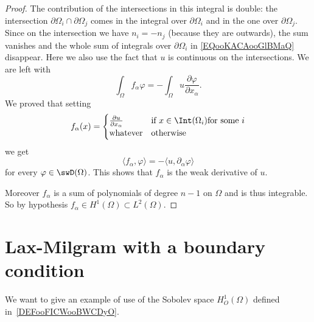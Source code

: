 \begin{proof}
	The contribution of the intersections in this integral is double: the intersection \( \partial\Omega_i\cap\partial\Omega_j\) comes in the integral over \( \partial\Omega_i\) and in the one over \( \partial\Omega_j\). Since on the intersection we have \( n_i=-n_j\) (because they are outwards), the sum vanishes and the whole sum of integrals over \( \partial\Omega_i\) in \eqref{EQooKACAooGlBMaQ} disappear. Here we also use the fact that \( u\) is continuous on the intersections. We are left with
	\begin{equation}
		\int_{\Omega}f_{\alpha}\varphi=-\int_{\Omega}u\frac{ \partial \varphi }{ \partial x_{\alpha} }.
	\end{equation}
	We proved that setting
	\begin{equation}
		f_{\alpha}(x)=\begin{cases}
			\frac{ \partial u }{ \partial x_{\alpha} } & \text{if } x\in\Int(\Omega_i) \text{for some }i \\
			\text{whatever}                            & \text{otherwise }
		\end{cases}
	\end{equation}
	we get
	\begin{equation}
		\langle f_{\alpha}, \varphi\rangle =-\langle u, \partial_{\alpha}\varphi\rangle
	\end{equation}
	for every \( \varphi\in\swD(\Omega)\). This shows that \( f_{\alpha}\) is the weak derivative of \( u\).

	Moreover \( f_{\alpha}\) is a sum of polynomials of degree \( n-1\) on \( \Omega\) and is thus integrable. So by hypothesis \( f_{\alpha}\in H^1(\Omega)\subset L^2(\Omega)\).
\end{proof}

\section{Lax-Milgram with a boundary condition}

We want to give an example of use of the Sobolev space \( H_O^1(\Omega)\) defined in~\ref{DEFooFICWooBWCDyO}.

